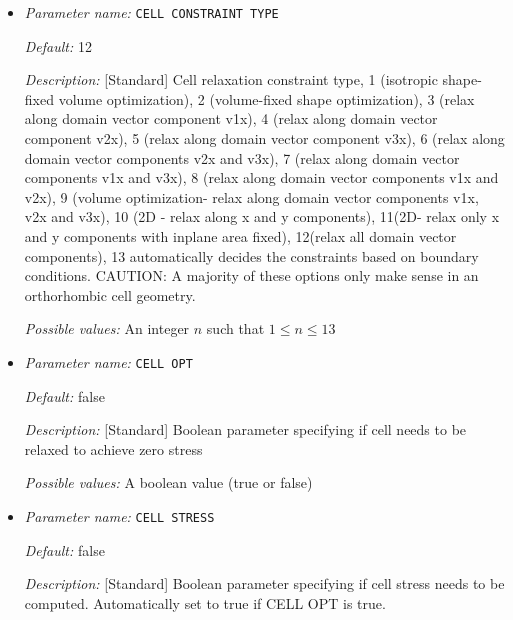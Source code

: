 \begin{itemize}
\item {\it Parameter name:} {\tt CELL CONSTRAINT TYPE}
\label{parameters:Geometry/Optimization/CELL CONSTRAINT TYPE}
\label{parameters:Geometry/Optimization/CELL_20CONSTRAINT_20TYPE}




{\it Default:} 12


{\it Description:} [Standard] Cell relaxation constraint type, 1 (isotropic shape-fixed volume optimization), 2 (volume-fixed shape optimization), 3 (relax along domain vector component v1x), 4 (relax along domain vector component v2x), 5 (relax along domain vector component v3x), 6 (relax along domain vector components v2x and v3x), 7 (relax along domain vector components v1x and v3x), 8 (relax along domain vector components v1x and v2x), 9 (volume optimization- relax along domain vector components v1x, v2x and v3x), 10 (2D - relax along x and y components), 11(2D- relax only x and y components with inplane area fixed), 12(relax all domain vector components), 13 automatically decides the constraints based on boundary conditions. CAUTION: A majority of these options only make sense in an orthorhombic cell geometry.


{\it Possible values:} An integer $n$ such that $1\leq n \leq 13$
\item {\it Parameter name:} {\tt CELL OPT}
\label{parameters:Geometry/Optimization/CELL OPT}
\label{parameters:Geometry/Optimization/CELL_20OPT}




{\it Default:} false


{\it Description:} [Standard] Boolean parameter specifying if cell needs to be relaxed to achieve zero stress


{\it Possible values:} A boolean value (true or false)
\item {\it Parameter name:} {\tt CELL STRESS}
\label{parameters:Geometry/Optimization/CELL STRESS}
\label{parameters:Geometry/Optimization/CELL_20STRESS}




{\it Default:} false


{\it Description:} [Standard] Boolean parameter specifying if cell stress needs to be computed. Automatically set to true if CELL OPT is true.



\end{itemize}
